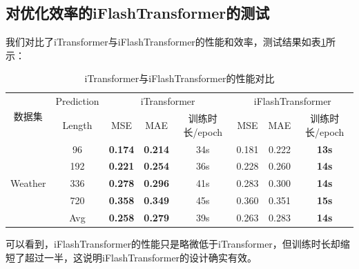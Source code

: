 \documentclass[twoside,12pt]{article}
\begin{document}
\subsection{对优化效率的iFlashTransformer的测试}
我们对比了iTransformer与iFlashTransformer的性能和效率，测试结果如表\ref{tab:itransformer_vs_iflashtransformer}所示：
\begin{table}[htbp]
  \caption{iTransformer与iFlashTransformer的性能对比}
  \label{tab:itransformer_vs_iflashtransformer}
  \vspace{5pt}
  \centering
  \resizebox{\textwidth}{!}
  {
    \begin{tabular}{c|c|ccc|ccc}
      \toprule
      \multirow{2}{*}{数据集}  & Prediction & \multicolumn{3}{c|}{iTransformer} & \multicolumn{3}{c}{iFlashTransformer}                                                   \\
      \cmidrule(lr){3-4} \cmidrule(lr){5-6}
                               & Length     & MSE                               & MAE                                   & 训练时长/epoch & MSE   & MAE   & 训练时长/epoch \\
      \midrule
      \multirow{5}{*}{Weather} & 96         & \textbf{0.174}                    & \textbf{0.214}                        & 34s            & 0.181 & 0.222 & \textbf{13s}   \\
                               & 192        & \textbf{0.221}                    & \textbf{0.254}                        & 36s            & 0.228 & 0.260 & \textbf{14s}   \\
                               & 336        & \textbf{0.278}                    & \textbf{0.296}                        & 41s            & 0.283 & 0.300 & \textbf{14s}   \\
                               & 720        & \textbf{0.358}                    & \textbf{0.349}                        & 45s            & 0.360 & 0.351 & \textbf{15s}   \\
      \cmidrule(lr){2-6}
                               & Avg        & \textbf{0.258}                    & \textbf{0.279}                        & 39s            & 0.263 & 0.283 & \textbf{14s}   \\
      \bottomrule
    \end{tabular}
  }
\end{table}

可以看到，iFlashTransformer的性能只是略微低于iTransformer，但训练时长却缩短了超过一半，这说明iFlashTransformer的设计确实有效。

\newpage
\end{document}
